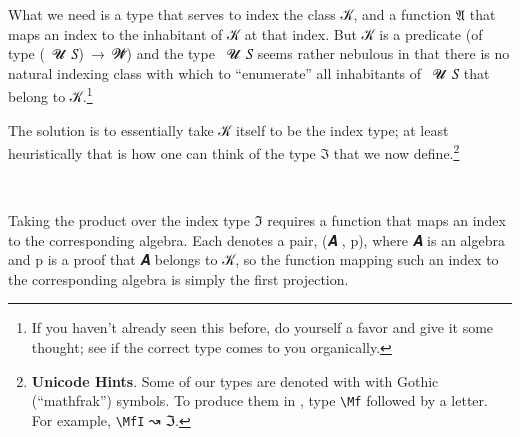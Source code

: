 What we need is a type that serves to index the class \ab 𝒦, and a function \af 𝔄 that maps an index to the inhabitant of \ab 𝒦 at that index. But \ab 𝒦 is a predicate (of type (~\ab 𝓤~\ab 𝑆)~\as →~\ab 𝓦\af ̇) and the type ~\ab 𝓤~\ab 𝑆 seems rather nebulous in that there is no natural indexing class with which to ``enumerate'' all inhabitants of ~\ab 𝓤~\ab 𝑆 that belong to \ab 𝒦.\footnote{%
If you haven't already seen this before, do yourself a favor and give it some thought; see if the correct type comes to you organically.}


The solution is to essentially take \ab 𝒦 itself to be the index type; at least heuristically that is how one can think of the type \af ℑ that we now define.\footnote{\textbf{Unicode Hints}. Some of our types are denoted with with Gothic (``mathfrak'') symbols. To produce them in \agdamode, type \texttt{\textbackslash{}Mf} followed by a letter. For example, \texttt{\textbackslash{}MfI} ↝ \af ℑ.}
\ccpad
\begin{code}%
\>[0][@{}l@{\AgdaIndent{0}}]%
\>[1]\AgdaSpace{}%
\AgdaSymbol{:}\AgdaSpace{}%
\AgdaSpace{}%
\AgdaSpace{}%
\<%
\\
%
\>[1]\AgdaSpace{}%
\AgdaSymbol{=}\AgdaSpace{}%
\AgdaSpace{}%
\AgdaSpace{}%
\AgdaSpace{}%
\AgdaSymbol{(}\AgdaSpace{}%
\AgdaSpace{}%
\AgdaSymbol{)}\AgdaSpace{}%
\AgdaFunction{,}\AgdaSpace{}%
\AgdaSymbol{(}\AgdaSpace{}%
\AgdaSpace{}%
\AgdaSymbol{)}\<%
\end{code}
\ccpad
Taking the product over the index type \af ℑ requires a function that maps an index  to the corresponding algebra.  Each  denotes a pair, (\ab 𝑨 , \ab p), where \ab 𝑨 is an algebra and \ab p is a proof that \ab 𝑨 belongs to \ab 𝒦, so the function mapping such an index to the corresponding algebra is simply the first projection.
